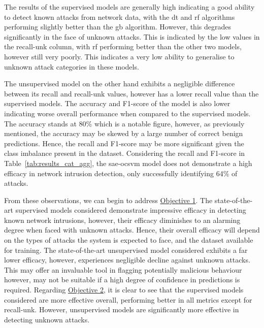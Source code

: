The results of the supervised models are generally high indicating a good
ability to detect known attacks from network data, with the \gls{dt} and
\gls{rf} algorithms performing slightly better than the \gls{gb} algorithm.
However, this degrades significantly in the face of unknown attacks. This is
indicated by the low values in the recall-unk column, with \gls{rf} performing
better than the other two models, however still very poorly. This indicates a
very low ability to generalise to unknown attack categories in these models.

The unsupervised model on the other hand exhibits a negligible difference
between its recall and recall-unk values, however has a lower recall value than
the supervised models. The accuracy and F1-score of the model is also lower
indicating worse overall performance when compared to the supervised models.
The accuracy stands at 80\% which is a notable figure, however, as previously
mentioned, the accuracy may be skewed by a large number of correct benign
predictions. Hence, the recall and F1-score may be more significant given the
class imbalance present in the dataset. Considering the recall and F1-score in
Table~\ref{tab:results_cat_agg}, the \gls{sae}-\gls{ocsvm} model does not
demonstrate a high efficacy in network intrusion detection, only successfully
identifying 64\% of attacks.

From these observations, we can begin to address \hyperlink{obj}{Objective 1}.
The state-of-the-art supervised models considered demonstrate impressive
efficacy in detecting known network intrusions, however, their efficacy
diminishes to an alarming degree when faced with unknown attacks. Hence, their
overall efficacy will depend on the types of attacks the system is expected to
face, and the dataset available for training. The state-of-the-art unsupervised
model considered exhibits a far lower efficacy, however, experiences negligible
decline against unknown attacks. This may offer an invaluable tool in flagging
potentially malicious behaviour however, may not be suitable if a high degree
of confidence in predictions is required. Regarding \hyperlink{obj}{Objective
    2}, it is clear to see that the supervised models considered are more effective
overall, performing better in all metrics except for recall-unk. However,
unsupervised models are significantly more effective in detecting unknown
attacks.

